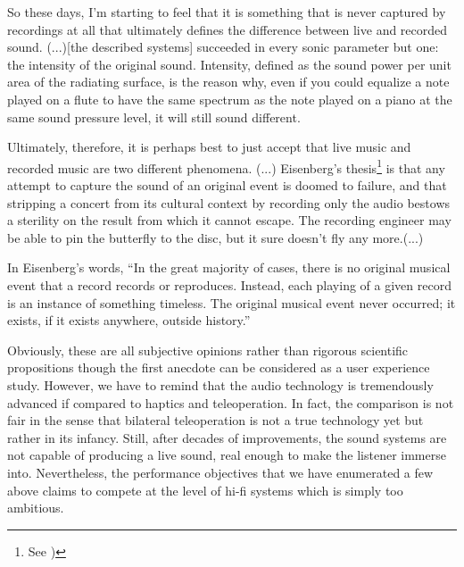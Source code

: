 \begin{displayquote}
So these days, I'm starting to feel that it is something that is never captured by recordings at all that ultimately defines the 
difference between live and recorded sound. (...)[the described systems] succeeded in 
every sonic parameter but one: the intensity of the original sound. Intensity, defined as the sound power per unit area of the 
radiating surface, is the reason why, even if you could equalize a note played on a flute to have the same spectrum as the note 
played on a piano at the same sound pressure level, it will still sound different.

Ultimately, therefore, it is perhaps best to just accept that live music and recorded music are two different phenomena. (...)
Eisenberg's thesis\footnote{See \cite{eisenberg})} is that any attempt to capture the sound of an original event is doomed to 
failure, and that stripping a concert from its cultural context by recording only the audio bestows a sterility on the result 
from which it cannot escape. The recording engineer may be able to pin the butterfly to the disc, but it sure doesn't fly any 
more.(...)

In Eisenberg's words, \enquote{In the great majority of cases, there is no original musical event that a record records or reproduces. 
Instead, each playing of a given record is an instance of something timeless. The original musical event never occurred; it exists, if 
it exists anywhere, outside history.}
\end{displayquote} 



Obviously, these are all subjective opinions rather than rigorous scientific propositions though the first anecdote can be considered as
a user experience study. However, we have to remind that the audio technology is tremendously advanced if compared to haptics and 
teleoperation. In fact, the comparison is not fair in the sense that bilateral teleoperation is not a true technology yet but rather 
in its infancy. Still, after decades of improvements, the sound systems are not capable of producing a live sound, real enough to make 
the listener immerse into. Nevertheless, the performance objectives that we have enumerated a few above claims to compete at the level
of hi-fi systems which is simply too ambitious.

